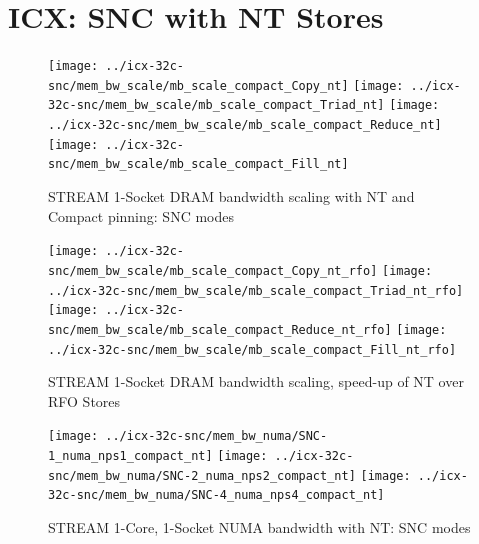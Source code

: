 \documentclass{article}
\begin{document}
\clearpage
\section{ICX: SNC with NT Stores}
\begin{figure}[!ht]
    \centering
    \texttt{[image: ../icx-32c-snc/mem\_bw\_scale/mb\_scale\_compact\_Copy\_nt]}
    \texttt{[image: ../icx-32c-snc/mem\_bw\_scale/mb\_scale\_compact\_Triad\_nt]}
    \texttt{[image: ../icx-32c-snc/mem\_bw\_scale/mb\_scale\_compact\_Reduce\_nt]}
    \texttt{[image: ../icx-32c-snc/mem\_bw\_scale/mb\_scale\_compact\_Fill\_nt]}
    \caption{STREAM 1-Socket DRAM bandwidth scaling with NT and Compact pinning: SNC modes}
    \label{figure:mem_bw_scale_compact_NT_icx_snc}
\end{figure}
\begin{figure}[!ht]
    \centering
    \texttt{[image: ../icx-32c-snc/mem\_bw\_scale/mb\_scale\_compact\_Copy\_nt\_rfo]}
    \texttt{[image: ../icx-32c-snc/mem\_bw\_scale/mb\_scale\_compact\_Triad\_nt\_rfo]}
    \texttt{[image: ../icx-32c-snc/mem\_bw\_scale/mb\_scale\_compact\_Reduce\_nt\_rfo]}
    \texttt{[image: ../icx-32c-snc/mem\_bw\_scale/mb\_scale\_compact\_Fill\_nt\_rfo]}
    \caption{STREAM 1-Socket DRAM bandwidth scaling, speed-up of NT over RFO Stores}
    \label{figure:mem_bw_scale_compact_nt_rfo_icx_snc}
\end{figure}

\begin{figure}[!ht]
    \centering
    \texttt{[image: ../icx-32c-snc/mem\_bw\_numa/SNC-1\_numa\_nps1\_compact\_nt]}
    \texttt{[image: ../icx-32c-snc/mem\_bw\_numa/SNC-2\_numa\_nps2\_compact\_nt]}
    \texttt{[image: ../icx-32c-snc/mem\_bw\_numa/SNC-4\_numa\_nps4\_compact\_nt]}
    \caption{STREAM 1-Core, 1-Socket NUMA bandwidth with NT: SNC modes}
    \label{figure:mem_bw_numa_nt_icx_snc}
\end{figure}

\clearpage
\end{document}

